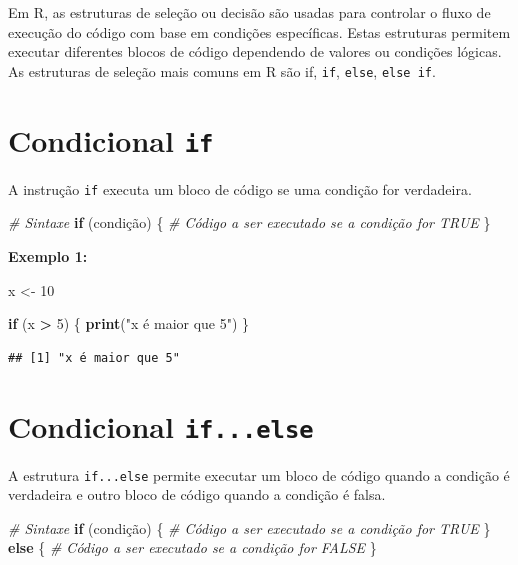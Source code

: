 \documentclass[
]{book}
\newenvironment{Shaded}{\begin{snugshade}}{\end{snugshade}}
\newcommand{\CommentTok}[1]{\textcolor[rgb]{0.56,0.35,0.01}{\textit{#1}}}
\newcommand{\ControlFlowTok}[1]{\textcolor[rgb]{0.13,0.29,0.53}{\textbf{#1}}}
\newcommand{\DecValTok}[1]{\textcolor[rgb]{0.00,0.00,0.81}{#1}}
\newcommand{\FunctionTok}[1]{\textcolor[rgb]{0.13,0.29,0.53}{\textbf{#1}}}
\newcommand{\NormalTok}[1]{#1}
\newcommand{\OtherTok}[1]{\textcolor[rgb]{0.56,0.35,0.01}{#1}}
\newcommand{\SpecialCharTok}[1]{\textcolor[rgb]{0.81,0.36,0.00}{\textbf{#1}}}
\newcommand{\StringTok}[1]{\textcolor[rgb]{0.31,0.60,0.02}{#1}}
\begin{document}
Em R, as estruturas de seleção ou decisão são usadas para controlar o fluxo de execução do código com base em condições específicas. Estas estruturas permitem executar diferentes blocos de código dependendo de valores ou condições lógicas. As estruturas de seleção mais comuns em R são if, \texttt{if}, \texttt{else}, \texttt{else\ if}.

\section{\texorpdfstring{Condicional \texttt{if}}{Condicional if}}\label{condicional-if}

A instrução \texttt{if} executa um bloco de código se uma condição for verdadeira.

\begin{Shaded}
\begin{Highlighting}[]
\CommentTok{\# Sintaxe   }
\ControlFlowTok{if}\NormalTok{ (condição) \{}
      \CommentTok{\# Código a ser executado se a condição for TRUE}
\NormalTok{\}}
\end{Highlighting}
\end{Shaded}

\textbf{Exemplo 1:}

\begin{Shaded}
\begin{Highlighting}[]
\NormalTok{x }\OtherTok{\textless{}{-}} \DecValTok{10}

\ControlFlowTok{if}\NormalTok{ (x }\SpecialCharTok{\textgreater{}} \DecValTok{5}\NormalTok{) \{}
      \FunctionTok{print}\NormalTok{(}\StringTok{"x é maior que 5"}\NormalTok{)}
\NormalTok{\}}
\end{Highlighting}
\end{Shaded}

\begin{verbatim}
## [1] "x é maior que 5"
\end{verbatim}

\section{\texorpdfstring{Condicional \texttt{if...else}}{Condicional if...else}}\label{condicional-if...else}

A estrutura \texttt{if...else} permite executar um bloco de código quando a condição é verdadeira e outro bloco de código quando a condição é falsa.

\begin{Shaded}
\begin{Highlighting}[]
\CommentTok{\# Sintaxe}
\ControlFlowTok{if}\NormalTok{ (condição) \{}
      \CommentTok{\# Código a ser executado se a condição for TRUE}
\NormalTok{\} }\ControlFlowTok{else}\NormalTok{ \{}
      \CommentTok{\# Código a ser executado se a condição for FALSE}
\NormalTok{\}}
\end{Highlighting}
\end{Shaded}
\end{document}
